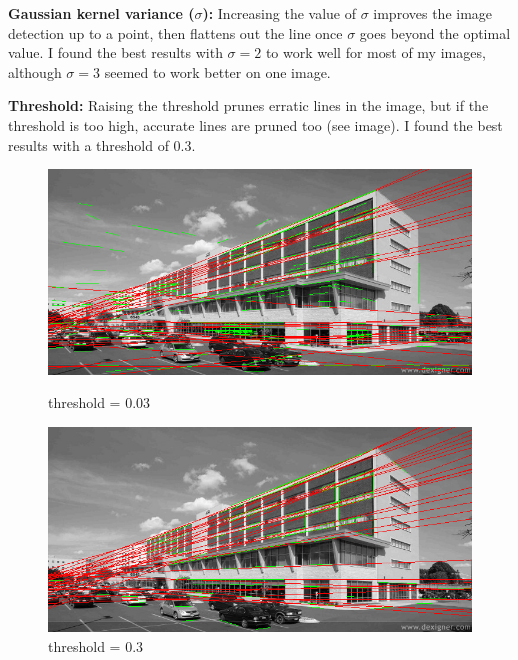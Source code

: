 \begin{enumroman}
  \item \textbf{Gaussian kernel variance ($\sigma$):}
    Increasing the value of $\sigma$ improves the image detection up to a point,
    then flattens out the line once $\sigma$ goes beyond the optimal value.
    I found the best results with $\sigma = 2$ to work well for most of my images,
    although $\sigma = 3$ seemed to work better on one image.
  \item \textbf{Threshold:}
    Raising the threshold prunes erratic lines in the image,
    but if the threshold is too high, accurate lines are pruned too
    (see image).
    I found the best results with a threshold of $0.3$.

    \begin{figure}[h]
      \centering
      \begin{minipage}{0.4\textwidth}
        \includegraphics[width=\textwidth]{images/09-threshold-0.03.png}
        \caption{threshold = $0.03$}
        \label{fig:threshold-0.03}
      \end{minipage}
      \begin{minipage}{0.4\textwidth}
        \includegraphics[width=\textwidth]{images/09-threshold-0.3.png}
        \caption{threshold = $0.3$}

\end{minipage}
\end{figure}
\end{enumroman}
